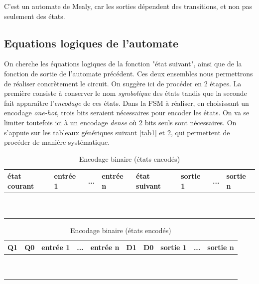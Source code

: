 \documentclass[a4paper,11pt]{article}
\begin{document}
C'est un automate de Mealy, car les sorties dépendent des transitions, et non pas seulement des états.

\subsection{Equations logiques de l'automate}
On cherche les équations logiques de la fonction "état suivant", ainsi que de la fonction de sortie de l'automate précédent. Ces deux ensembles
nous permettrons de réaliser concrètement le circuit. On suggère ici de procéder en 2 étapes.
La première consiste à conserver le nom {\it symbolique} des états tandis que la seconde fait apparaître l'{\it encodage} de ces états.
Dans la FSM à réaliser, en choisissant un encodage {\it one-hot}, trois bits seraient nécessaires pour encoder les états.
On va se limiter toutefois ici à un encodage {\it dense} où 2 bits seuls sont nécessaires. On s'appuie sur les tableaux génériques suivant \ref{tab1} et \ref{tab2},
qui permettent de procéder de manière systématique.
\begin{table}[htp]

  \centering
  \caption{Encodage symbolique (nom des états préservés)}\label{tab1}

  \begin{tabular}{|l|l|l|l||l|l|l|l|}
      \hline
      état courant & entrée 1 & ... & entrée n &  état suivant & sortie 1 & ... & sortie n \\ \hline
      ~        & ~    & ~         & ~            & ~            & ~        & ~   & ~        \\
      ~        & ~   & ~     & ~            & ~            & ~        & ~   & ~        \\
      \hline
  \end{tabular}

  \bigskip

  \caption{Encodage binaire (états encodés)}\label{tab2}

  \begin{tabular}{|l|l|l|l||l|l|l|l|l|l|}
    \hline
    Q1 & Q0 &  entrée 1 & ... & entrée n & D1 & D0 & sortie 1 & ... & sortie n \\ \hline
    ~        & ~  & ~  & ~  & ~  & ~  & ~  & ~        & ~   & ~        \\
    ~        & ~  & ~  & ~  & ~  & ~  & ~  & ~        & ~   & ~        \\
    \hline
  \end{tabular}

\end{table}
\end{document}
